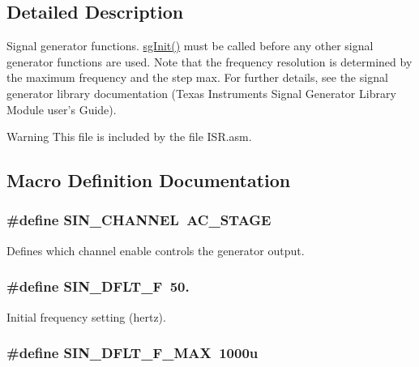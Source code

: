 \subsection{Detailed Description}
Signal generator functions. \hyperlink{a00033_a41e810f7181a4ecaa5bc5f0713c6db89}{sg\-Init()} must be called before any other signal generator functions are used. Note that the frequency resolution is determined by the maximum frequency and the step max. For further details, see the signal generator library documentation (Texas Instruments Signal Generator Library Module user's Guide).

\begin{DoxyWarning}{Warning}
This file is included by the file I\-S\-R.\-asm. 
\end{DoxyWarning}


\subsection{Macro Definition Documentation}
\hypertarget{a00033_a71b6211a4d077af219d7e503f17114d1}{
\subsubsection[{S\-I\-N\-\_\-\-C\-H\-A\-N\-N\-E\-L}]{\setlength{\rightskip}{0pt plus 5cm}\#define S\-I\-N\-\_\-\-C\-H\-A\-N\-N\-E\-L~{\bf A\-C\-\_\-\-S\-T\-A\-G\-E}}}\label{a00033_a71b6211a4d077af219d7e503f17114d1}
Defines which channel enable controls the generator output. \hypertarget{a00033_aa1d98c477c6de604fc6ca986f2d83238}{
\subsubsection[{S\-I\-N\-\_\-\-D\-F\-L\-T\-\_\-\-F}]{\setlength{\rightskip}{0pt plus 5cm}\#define S\-I\-N\-\_\-\-D\-F\-L\-T\-\_\-\-F~50.}}\label{a00033_aa1d98c477c6de604fc6ca986f2d83238}
Initial frequency setting (hertz). \hypertarget{a00033_a1640e33dcd5a970b4a9731ec68125bd6}{
\subsubsection[{S\-I\-N\-\_\-\-D\-F\-L\-T\-\_\-\-F\-\_\-\-M\-A\-X}]{\setlength{\rightskip}{0pt plus 5cm}\#define S\-I\-N\-\_\-\-D\-F\-L\-T\-\_\-\-F\-\_\-\-M\-A\-X~1000u}}\label{a00033_a1640e33dcd5a970b4a9731ec68125bd6}
